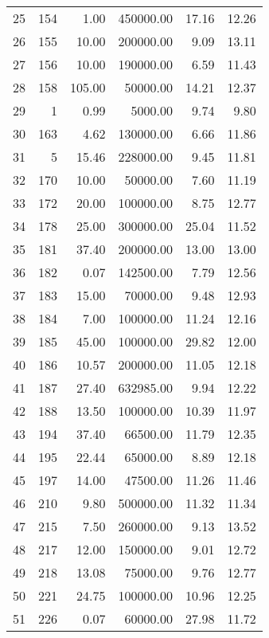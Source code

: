 \begin{tabular}{rrrrrr}
    25 &    154 &   1.00 & 450000.00 &  17.16 & 12.26 \\
    26 &    155 &  10.00 & 200000.00 &   9.09 & 13.11 \\
    27 &    156 &  10.00 & 190000.00 &   6.59 & 11.43 \\
    28 &    158 & 105.00 &  50000.00 &  14.21 & 12.37 \\
    29 &      1 &   0.99 &   5000.00 &   9.74 &  9.80 \\
    30 &    163 &   4.62 & 130000.00 &   6.66 & 11.86 \\
    31 &      5 &  15.46 & 228000.00 &   9.45 & 11.81 \\
    32 &    170 &  10.00 &  50000.00 &   7.60 & 11.19 \\
    33 &    172 &  20.00 & 100000.00 &   8.75 & 12.77 \\
    34 &    178 &  25.00 & 300000.00 &  25.04 & 11.52 \\
    35 &    181 &  37.40 & 200000.00 &  13.00 & 13.00 \\
    36 &    182 &   0.07 & 142500.00 &   7.79 & 12.56 \\
    37 &    183 &  15.00 &  70000.00 &   9.48 & 12.93 \\
    38 &    184 &   7.00 & 100000.00 &  11.24 & 12.16 \\
    39 &    185 &  45.00 & 100000.00 &  29.82 & 12.00 \\
    40 &    186 &  10.57 & 200000.00 &  11.05 & 12.18 \\
    41 &    187 &  27.40 & 632985.00 &   9.94 & 12.22 \\
    42 &    188 &  13.50 & 100000.00 &  10.39 & 11.97 \\
    43 &    194 &  37.40 &  66500.00 &  11.79 & 12.35 \\
    44 &    195 &  22.44 &  65000.00 &   8.89 & 12.18 \\
    45 &    197 &  14.00 &  47500.00 &  11.26 & 11.46 \\
    46 &    210 &   9.80 & 500000.00 &  11.32 & 11.34 \\
    47 &    215 &   7.50 & 260000.00 &   9.13 & 13.52 \\
    48 &    217 &  12.00 & 150000.00 &   9.01 & 12.72 \\
    49 &    218 &  13.08 &  75000.00 &   9.76 & 12.77 \\
    50 &    221 &  24.75 & 100000.00 &  10.96 & 12.25 \\
    51 &    226 &   0.07 &  60000.00 &  27.98 & 11.72 \\

\end{tabular}
